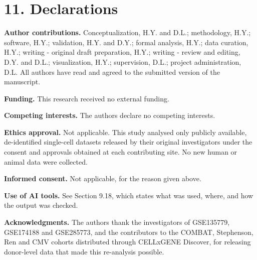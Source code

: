 \section{11. Declarations}\label{declarations}

\textbf{Author contributions.} Conceptualization, H.Y. and D.L.; methodology, H.Y.; software, H.Y.; validation, H.Y. and D.Y.; formal analysis, H.Y.; data curation, H.Y.; writing - original draft preparation, H.Y.; writing - review and editing, D.Y. and D.L.; visualization, H.Y.; supervision, D.L.; project administration, D.L. All authors have read and agreed to the submitted version of the manuscript.

\textbf{Funding.} This research received no external funding.

\textbf{Competing interests.} The authors declare no competing interests.

\textbf{Ethics approval.} Not applicable. This study analysed only publicly available, de-identified single-cell datasets released by their original investigators under the consent and approvals obtained at each contributing site. No new human or animal data were collected.

\textbf{Informed consent.} Not applicable, for the reason given above.

\textbf{Use of AI tools.} See Section 9.18, which states what was used, where, and how the output was checked.

\textbf{Acknowledgments.} The authors thank the investigators of GSE135779, GSE174188 and GSE285773, and the contributors to the COMBAT, Stephenson, Ren and CMV cohorts distributed through CELLxGENE Discover, for releasing donor-level data that made this re-analysis possible.

